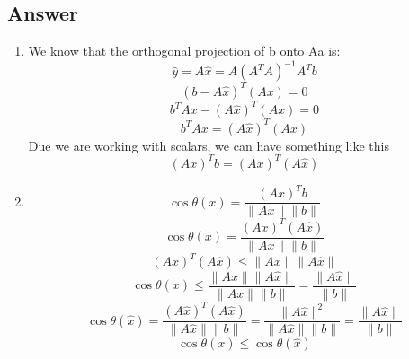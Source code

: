 \documentclass[conference, onecolumn]{IEEEtran}
\begin{document}
	\subsection*{Answer}
	\begin{enumerate}
		\item[(a)] We know that the orthogonal projection of b onto Aa is:
		\begin{equation}
			\hat{y} = A\hat{x} = A(A^T A)^{-1} A^T b
		\end{equation}
		\begin{equation}
			(b - A\hat{x})^T (Ax) = 0
		\end{equation}
		\begin{equation}
			b^T Ax - (A\hat{x})^T (Ax) = 0
		\end{equation}
		\begin{equation}
			b^T Ax = (A\hat{x})^T (Ax)
		\end{equation}
		Due we are working with scalars, we can have something like this
		\begin{equation}
			(Ax)^Tb = (Ax)^T(A\hat{x})
		\end{equation}
		
		\item[(b)] 
		\begin{equation}
			\cos \theta(x) = \frac{(Ax)^T b}{\|Ax\|\|b\|}
		\end{equation}
		\begin{equation}
			\cos \theta(x) = \frac{(Ax)^T (A\hat{x})}{\|Ax\|\|b\|}
		\end{equation}
		\begin{equation}
			(Ax)^T (A\hat{x}) \le \|Ax\|\|A\hat{x}\|
		\end{equation}
		\begin{equation}
			\cos \theta(x) \le \frac{\|Ax\|\|A\hat{x}\|}{\|Ax\|\|b\|} = \frac{\|A\hat{x}\|}{\|b\|}
		\end{equation}
		\begin{equation}
			\cos \theta(\hat{x}) = \frac{(A\hat{x})^T (A\hat{x})}{\|A\hat{x}\|\|b\|} = \frac{\|A\hat{x}\|^2}{\|A\hat{x}\|\|b\|} = \frac{\|A\hat{x}\|}{\|b\|}
		\end{equation}
		\begin{equation}
			\cos \theta(x) \le \cos \theta(\hat{x})
		\end{equation}
	\end{enumerate}
	
	
\end{document}

